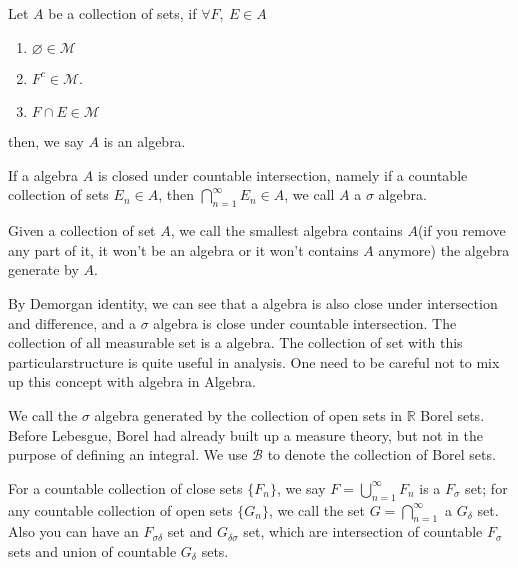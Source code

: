 \documentclass[lang=en, 12pt]{elegantbook}
\newcommand{\RR}{\mathbb{R}}
\begin{document}
            \begin{definition}
                Let $A$ be a collection of sets, if $\forall F, \ E \in A$ 
                \begin{enumerate}
                    \item $\varnothing \in \mathcal{M}$
                    \item $F^c \in \mathcal{M}$.
                    \item $F \cap E \in \mathcal{M}$
                \end{enumerate}
                then, we say $A$ is an algebra.\par
                If a algebra $A$ is closed under countable intersection, namely if a countable collection of sets ${E_n} \in A$, then $\bigcap_{n=1}^{\infty}E_n \in A$,
            we call $A$ a $\sigma$ algebra.\par
                Given a collection of set $A$, we call the smallest algebra contains $A$(if you remove any part of it, it won't be an algebra or it won't 
            contains $A$ anymore) the algebra generate by $A$.                  
            \end{definition}
            By Demorgan identity, we can see that a algebra is also close under intersection and difference, and a $\sigma$ algebra is close under 
        countable intersection. The collection of all measurable set is a algebra. The collection of set with this particularstructure is 
        quite useful in analysis. One need to be careful not to mix up this concept with algebra in Algebra. 
            \begin{example}
                We call the $\sigma$ algebra generated by the collection of open sets in $\RR$ Borel sets. Before Lebesgue, Borel had already built
            up a measure theory, but not in the purpose of defining an integral. We use $\mathcal{B}$ to denote the collection of Borel sets. 
            \end{example}
            \begin{definition}
                For a countable collection of close sets $\{F_n\}$, we say $F = \bigcup_{n=1}^{\infty}F_n$ is a $F_{\sigma}$ set; for any countable collection of 
            open sets $\{G_n\}$, we call the set $G = \bigcap_{n=1}^{\infty}$ a $G_{\delta}$ set. Also you can have an $F_{\sigma \delta}$ set
            and $G_{\delta \sigma}$ set, which are intersection of countable $F_{\sigma}$ sets and union of countable $G_{\delta}$ sets.   
            \end{definition}
\end{document}
